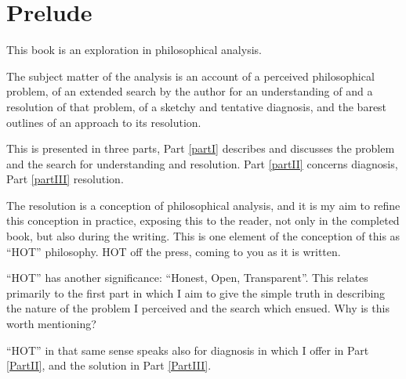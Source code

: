 \mainmatter
\def\rbjidprelude{$$Id: prelude.tex,v 1.4 2010/02/06 16:19:48 rbj Exp $$}

\chapter*{Prelude}\label{Prelude}

This book is an exploration in philosophical analysis.

The subject matter of the analysis is an account of a perceived philosophical problem, of an extended search by the author for an understanding of and a resolution of that problem, of a sketchy and tentative diagnosis, and the barest outlines of an approach to its resolution.

This is presented in three parts, Part \ref{partI} describes and discusses the problem and the search for understanding and resolution.
Part \ref{partII} concerns diagnosis, Part \ref{partIII} resolution.

The resolution is a conception of philosophical analysis, and it is my aim to refine this conception in practice, exposing this to the reader, not only in the completed book, but also during the writing.
This is one element of the conception of this as ``HOT'' philosophy.
HOT off the press, coming to you as it is written.

``HOT'' has another significance: ``Honest, Open, Transparent''.
This relates primarily to the first part in which I aim to give the simple truth in describing the nature of the problem I perceived and the search which ensued.
Why is this worth mentioning?

``HOT'' in that same sense speaks also for diagnosis in which I offer in Part \ref{PartII}, and the solution in Part \ref{PartIII}.


